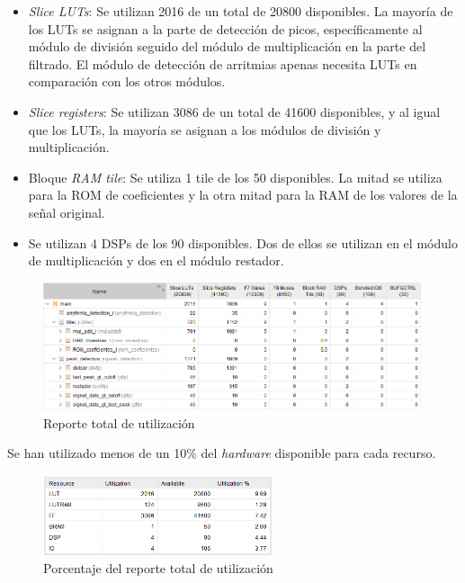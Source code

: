 \begin{itemize}
    \item \textit{Slice LUTs}: Se utilizan 2016 de un total de 20800 disponibles. La mayoría de los LUTs se asignan a la parte de detección de picos, específicamente al módulo de división seguido del módulo de multiplicación en la parte del filtrado. El módulo de detección de arritmias apenas necesita LUTs en comparación con los otros módulos.
    \item \textit{Slice registers}: Se utilizan 3086 de un total de 41600 disponibles, y al igual que los LUTs, la mayoría se asignan a los módulos de división y multiplicación.
    \item Bloque \textit{RAM tile}: Se utiliza 1 tile de los 50 disponibles. La mitad se utiliza para la ROM de coeficientes y la otra mitad para la RAM de los valores de la señal original.
    \item Se utilizan 4 DSPs de los 90 disponibles. Dos de ellos se utilizan en el módulo de multiplicación y dos en el módulo restador.
\end{itemize}


\begin{figure}[h]
	\centering
	\includegraphics[width=0.99\textwidth]{./Images/img_res_experimentales/utilization1.png}
	\caption{Reporte total de utilización}
	\label{fig:utilization1}
\end{figure}

Se han utilizado menos de un 10\% del  \textit{hardware}  disponible para cada recurso.
\begin{figure}[h]
	\centering
	\includegraphics[width=0.6\textwidth]{./Images/img_res_experimentales/utilization2.png}
	\caption{Porcentaje del reporte total de utilización}
	\label{fig:utilization2}
\end{figure}

